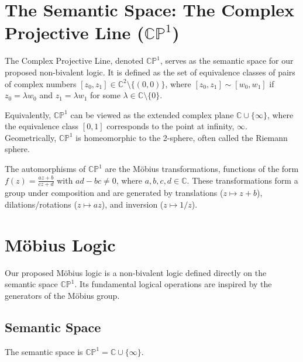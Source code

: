 












	
	
	\section{The Semantic Space: The Complex Projective Line ($\mathbb{CP}^1$)}
	
	The Complex Projective Line, denoted $\mathbb{CP}^1$, serves as the semantic space for our proposed non-bivalent logic. It is defined as the set of equivalence classes of pairs of complex numbers $[z_0, z_1] \in \mathbb{C}^2 \setminus \{(0,0)\}$, where $[z_0, z_1] \sim [w_0, w_1]$ if $z_0 = \lambda w_0$ and $z_1 = \lambda w_1$ for some $\lambda \in \mathbb{C} \setminus \{0\}$.
	
	Equivalently, $\mathbb{CP}^1$ can be viewed as the extended complex plane $\mathbb{C} \cup \{\infty\}$, where the equivalence class $[0, 1]$ corresponds to the point at infinity, $\infty$. Geometrically, $\mathbb{CP}^1$ is homeomorphic to the 2-sphere, often called the Riemann sphere.
	
	The automorphisms of $\mathbb{CP}^1$ are the M\"{o}bius transformations, functions of the form $f(z) = \frac{az+b}{cz+d}$ with $ad-bc \neq 0$, where $a, b, c, d \in \mathbb{C}$. These transformations form a group under composition and are generated by translations ($z \mapsto z+b$), dilations/rotations ($z \mapsto az$), and inversion ($z \mapsto 1/z$).
	
	\section{Möbius Logic}
	
	Our proposed M\"{o}bius logic is a non-bivalent logic defined directly on the semantic space $\mathbb{CP}^1$. Its fundamental logical operations are inspired by the generators of the M\"{o}bius group.
	
	\subsection{Semantic Space}
	The semantic space is $\mathbb{CP}^1 = \mathbb{C} \cup \{\infty\}$.
	
